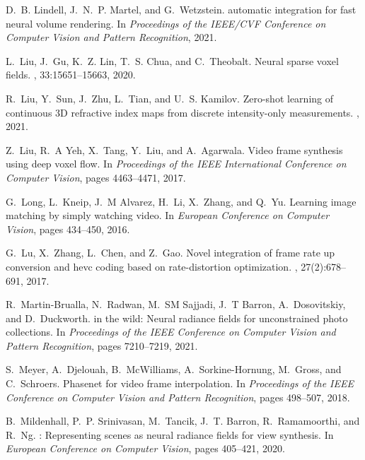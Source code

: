 \documentclass[12pt]{article}
\begin{document}
\begin{thebibliography}{10}
D.~B. Lindell, J.~N.~P. Martel, and G.~Wetzstein.
 automatic integration for fast neural volume rendering.
\newblock In {\em Proceedings of the IEEE/CVF Conference on Computer Vision and
  Pattern Recognition}, 2021.

L.~Liu, J.~Gu, K.~Z. Lin, T.~S. Chua, and C.~Theobalt.
\newblock Neural sparse voxel fields.
,
  33:15651--15663, 2020.

R.~Liu, Y.~Sun, J.~Zhu, L.~Tian, and U.~S. Kamilov.
\newblock Zero-shot learning of continuous {3D} refractive index maps from
  discrete intensity-only measurements.
, 2021.

Z.~Liu, R.~A Yeh, X.~Tang, Y.~Liu, and A.~Agarwala.
\newblock Video frame synthesis using deep voxel flow.
\newblock In {\em Proceedings of the IEEE International Conference on Computer
  Vision}, pages 4463--4471, 2017.

G.~Long, L.~Kneip, J.~M Alvarez, H.~Li, X.~Zhang, and Q.~Yu.
\newblock Learning image matching by simply watching video.
\newblock In {\em European Conference on Computer Vision}, pages 434--450,
  2016.

G.~Lu, X.~Zhang, L.~Chen, and Z.~Gao.
\newblock Novel integration of frame rate up conversion and hevc coding based
  on rate-distortion optimization.
, 27(2):678--691, 2017.

R.~Martin-Brualla, N.~Radwan, M.~SM Sajjadi, J.~T Barron, A.~Dosovitskiy, and
  D.~Duckworth.
 in the wild: Neural radiance fields for unconstrained photo
  collections.
\newblock In {\em Proceedings of the IEEE Conference on Computer Vision and
  Pattern Recognition}, pages 7210--7219, 2021.

S.~Meyer, A.~Djelouah, B.~McWilliams, A.~Sorkine-Hornung, M.~Gross, and
  C.~Schroers.
\newblock Phasenet for video frame interpolation.
\newblock In {\em Proceedings of the IEEE Conference on Computer Vision and
  Pattern Recognition}, pages 498--507, 2018.

B.~Mildenhall, P.~P. Srinivasan, M.~Tancik, J.~T. Barron, R.~Ramamoorthi, and
  R.~Ng.
: Representing scenes as neural radiance fields for view
  synthesis.
\newblock In {\em European Conference on Computer Vision}, pages 405--421,
  2020.


\end{thebibliography}
\end{document}
